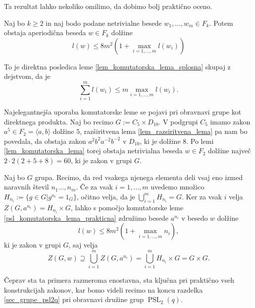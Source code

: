 Ta rezultat lahko nekoliko omilimo, da dobimo bolj praktično oceno.
\begin{posledica}
\label{psl_komutatorska_lema_prakticna}
Naj bo $k \ge 2$ in naj bodo podane netrivialne besede $w_1, \ldots, w_m \in  F_k$. Potem obstaja aperiodična beseda $w \in  F_k$ dolžine \begin{equation*}
l(w) \le 8m^2 \left(1 +  \max_{i = 1, \ldots, m} l(w_i) \right)
\end{equation*}      
\end{posledica}
\begin{dokaz}
    To je direktna posledica leme \ref{lem_komutatorska_lema_splosna} skupaj z dejstvom, da je \begin{equation*}
    \sum_{i = 1}^{m} l(w_{i}) \le m \max_{i = 1, \ldots, m} l(w_i).
    \end{equation*}  
\end{dokaz}


\begin{primer}\label{prm_komutatorska_produkt_elementov}
Najelegantnejša uporaba komutatorske leme se pojavi pri obravnavi grupe kot direktnega produkta. Naj bo recimo $G := C_5 \times D_{10}$. 
V podgrupi $C_5$ imamo zakon $a^{5} \in F_2 = \langle a, b \rangle $ dolžine $5$, razširitvena lema \ref{lem_razsiritvena_lema} pa nam bo povedala, da obstaja zakon $a^2 b^2 a^{-2} b^{-2}$ v $D_{10}$, ki je dolžine 8. Po lemi \ref{lem_komutatorska_lema} torej obstaja
netrivialna beseda $w \in F_2$ dolžine največ $2 \cdot 2 (2 + 5 + 8) = 60$, ki je zakon v grupi $G$.
\end{primer}
\begin{primer}\label{prm_komutatorska_redi_elementov}
Naj bo $G$ grupa. Recimo, da red vsakega njenega elementa deli vsaj eno izmed naravnih števil $n_1 \ldots, n_m$. Če za vsak $i = 1, \ldots , m$ uvedemo množico $H_{n_i} := \{ g \in G \vert g^{n_i} = 1_G \}$,
očitno velja, da je $\bigcup_{i = 1}^m H_{n_i} = G$. Ker za vsak $i$ velja $Z(G, a^{n_i}) = H_{n_i} \times G$, lahko s pomočjo komutatorske leme \ref{psl_komutatorska_lema_prakticna} združimo besede $a^{n_i}$ v besedo $w$ dolžine
\begin{equation*}
    l(w) \le 8 m^2 \left( 1 + \max_{i = 1, \ldots, m} n_i \right),
\end{equation*}
ki je zakon v grupi $G$, saj velja \begin{equation*}
    Z(G, w) \supseteq \bigcup_{i = 1}^m Z(G, a^{n_i}) =  \bigcup_{i = 1}^m H_{n_i} \times G = G \times G.
\end{equation*}\end{primer}
Čeprav sta ta primera razmeroma enostavna, sta ključna pri praktično vseh konstrukcijah zakonov, kar bomo videli recimo na koncu razdelka \ref{sec_grupe_psl2q} pri obravnavi družine grup $\operatorname{PSL}_2(q)$. 



